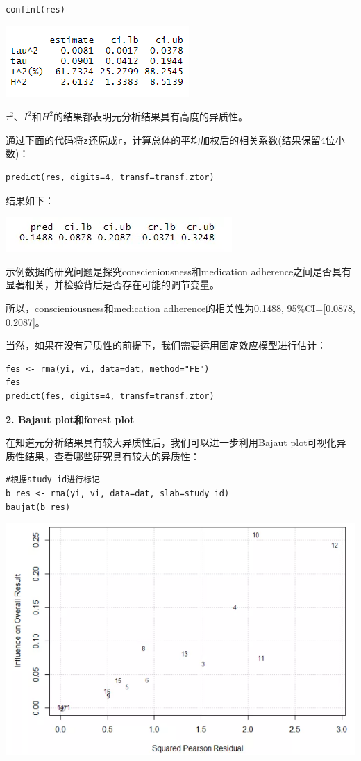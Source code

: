 \documentclass[
]{book}
\begin{document}
\begin{verbatim}
confint(res)
\end{verbatim}

\includegraphics{figs/3212.png}

\(\tau^{2}\)、\(I^{2}\)和\(H^{2}\)的结果都表明元分析结果具有高度的异质性。

通过下面的代码将\texttt{z}还原成\texttt{r}，计算总体的平均加权后的相关系数(结果保留4位小数)：

\begin{verbatim}
predict(res, digits=4, transf=transf.ztor)
\end{verbatim}

结果如下：

\includegraphics{figs/3213.png}

示例数据的研究问题是探究conscieniousness和medication adherence之间是否具有显著相关，并检验背后是否存在可能的调节变量。

所以，conscieniousness和medication adherence的相关性为0.1488, 95\%CI={[}0.0878, 0.2087{]}。

当然，如果在没有异质性的前提下，我们需要运用固定效应模型进行估计：

\begin{verbatim}
fes <- rma(yi, vi, data=dat, method="FE") 
fes
predict(fes, digits=4, transf=transf.ztor)
\end{verbatim}

\textbf{2. Bajaut plot和forest plot}

在知道元分析结果具有较大异质性后，我们可以进一步利用Bajaut plot可视化异质性结果，查看哪些研究具有较大的异质性：

\begin{verbatim}
#根据study_id进行标记
b_res <- rma(yi, vi, data=dat, slab=study_id)  
baujat(b_res)
\end{verbatim}

\includegraphics{figs/3221.png}
\end{document}
